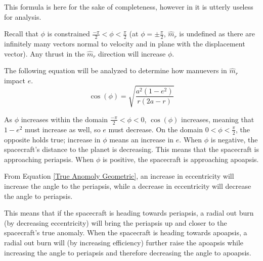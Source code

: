\documentclass[../basicOrbitalDynamics.tex]{subfiles}
\begin{document}
This formula is here for the sake of completeness, however in it is utterly useless for analysis.

Recall that $\phi$ is constrained $\frac{-\pi}{2}<\phi<\frac{\pi}{2}$ (at $\phi=\pm\frac{\pi}{2}$, $\hat{m}_r$ is undefined as there are infinitely many vectors normal to velocity and in plane with the displacement vector). Any thrust in the $\hat{m}_r$ direction will increase $\phi$.

The following equation will be analyzed to determine how manuevers in $\hat{m}_r$ impact $e$.
\[\cos(\phi)=\sqrt{\frac{a^2(1-e^2)}{r(2a-r)}}\]

As $\phi$ increases within the domain $\frac{-\pi}{2}<\phi<0$, $\cos(\phi)$ increases, meaning that $1-e^2$ must increase as well, so $e$ must decrease. On the domain $0<\phi<\frac{\pi}{2}$, the opposite holds true; increase in $\phi$ means an increase in $e$. When $\phi$ is negative, the spacecraft's distance to the planet is decreasing. This means that the spacecraft is approaching periapsis. When $\phi$ is positive, the spacecraft is approaching apoapsis.

From Equation  \eqref{True Anomoly Geometric}, an increase in eccentricity will increase the angle to the periapsis, while a decrease in eccentricity will decrease the angle to periapsis.

This means that if the spacecraft is heading towards periapsis, a radial out burn (by decreasing eccentricity) will bring the periapsis up and closer to the spacecraft's true anomaly. When the spacecraft is heading towards apoapsis, a radial out burn will (by increasing efficiency) further raise the apoapsis while increasing the angle to periapsis and therefore decreasing the angle to apoapsis.
\begin{comment}
\begin{figure}[H]
    \centering
    \begin{tikzpicture}[>=latex]
        \def\SMA{2}
        \def\vO{7}
        \def\phiO{0}
        \def\X{\fpeval{-sqrt(3)}}
        \def\Y{1}
        \def\posR{\fpeval{sqrt((\X)^2+\Y^2)}}
        \fill(0,0) circle (2pt);
        \foreach \dV in {1,2,3,4,5,6,7,8,9,10}
        {
        \definecolor{orbCol}{gray}{\fpeval{1-\dV/20}}
        \def\ecc{\fpeval{sqrt(1-(cos(\dV/\vO))^2*(1-tan(\phiO)*tan(\dV/\vO))^2)}}
        \def\omeg{\fpeval{atan(\Y/\X)-acos((\SMA*(1-\ecc^2)-\posR)/(\ecc*\posR))}}
        \def\slr{\fpeval{\SMA*(1-\ecc^2)}}
        \draw[domain=0:2*pi,samples=300, orbCol] plot ({deg(\x+\omeg)-180}:{(\slr)/(1+\ecc*cos(\x r))});
        \fill[blue] (\X,\Y) circle (3pt);
        }
    \end{tikzpicture}
    \caption{A counterclockwise orbit with progressively-labeled burns in the $\hat{u}_r$ direction. The darker the orbit, the more $\Delta V$ has been expended. The beginning orbit is the near-circular one. The spacecraft is the blue point. If the spacecraft were instead orbiting clockwise, then the lighter shades would indicate more $\Delta V$ expenditure with the darker orbit being the original orbit}
\end{figure}
\end{comment}
\end{document}
